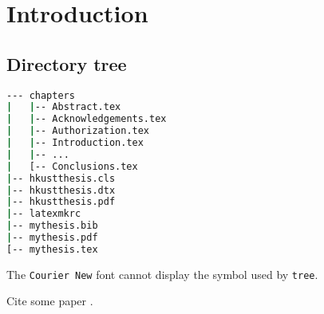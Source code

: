 \chapter{Introduction}

\section{Directory tree}
\label{sec:directory}

\begin{lstlisting}[language=bash]
--- chapters
|   |-- Abstract.tex
|   |-- Acknowledgements.tex
|   |-- Authorization.tex
|   |-- Introduction.tex
|   |-- ...
|   [-- Conclusions.tex
|-- hkustthesis.cls
|-- hkustthesis.dtx
|-- hkustthesis.pdf
|-- latexmkrc
|-- mythesis.bib
|-- mythesis.pdf
[-- mythesis.tex
\end{lstlisting}

The \lstinline|Courier New| font cannot display the symbol used by \lstinline|tree|.

Cite some paper \cite{test}.
